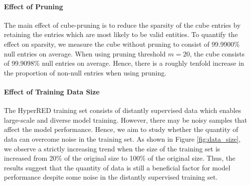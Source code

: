 \documentclass[11pt]{article}
\newcommand{\dataname}{HyperRED}
\begin{document}
\paragraph{Effect of Pruning}
The main effect of cube-pruning is to reduce the sparsity of the cube entries by retaining the entries which are most likely to be valid entities.
To quantify the effect on sparsity, we measure the cube without pruning to consist of 99.9900\% null entries on average.
When using pruning threshold $m=20$, the cube consists of 99.9098\% null entries on average.
Hence, there is a roughly tenfold increase in the proportion of non-null entries when using pruning.

\paragraph{Effect of Training Data Size}
\label{sec:size}
The \dataname{} training set consists of distantly supervised data which enables large-scale and diverse model training.
However, there may be noisy samples that affect the model performance.
Hence, we aim to study whether the quantity of data can overcome noise in the training set.
As shown in Figure \ref{fig:data_size}, we observe a strictly increasing trend when the size of the training set is increased from 20\% of the original size to 100\% of the original size.
Thus, the results suggest that the quantity of data is still a beneficial factor for model performance despite some noise in the distantly supervised training set.
\end{document}
